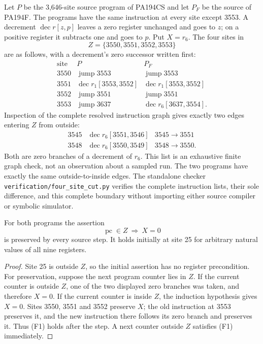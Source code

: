 Let $P$ be the 3,646-site source program of PA194CS and let $P_F$ be the
source of PA194F. The programs have the same instruction at every site
except 3553. A decrement
$\operatorname{dec}r[z,p]$ leaves a zero register unchanged and goes to $z$;
on a positive register it subtracts one and goes to $p$. Put $X=r_6$.
The four sites in
\[
                         Z=\{3550,3551,3552,3553\}
\]
are as follows, with a decrement's zero successor written first:
\[
\begin{array}{r|l|l}
\text{site}&P&P_F\\\hline
3550&\operatorname{jump}3553&\operatorname{jump}3553\\
3551&\operatorname{dec}r_1[3553,3552]
    &\operatorname{dec}r_1[3553,3552]\\
3552&\operatorname{jump}3551&\operatorname{jump}3551\\
3553&\operatorname{jump}3637&\operatorname{dec}r_6[3637,3554].
\end{array}
\]
Inspection of the complete resolved instruction graph gives exactly two
edges entering $Z$ from outside:
\[
\begin{array}{r|l|c}
3545&\operatorname{dec}r_6[3551,3546]&3545\longrightarrow3551\\
3548&\operatorname{dec}r_6[3550,3549]&3548\longrightarrow3550.
\end{array}
\]
Both are zero branches of a decrement of $r_6$. This list is an exhaustive
finite graph check, not an observation about a sampled run. The two
programs have exactly the same outside-to-inside edges.
The standalone checker \texttt{verification/four\_site\_cut.py} verifies
the complete instruction lists, their sole difference, and this complete
boundary without importing either source compiler or symbolic simulator.

\begin{lemma}
For both programs the assertion
\[
                   \operatorname{pc}\in Z\ \Longrightarrow\ X=0
                                                        \tag{F1}
\]
is preserved by every source step. It holds initially at site 25 for
arbitrary natural values of all nine registers.
\end{lemma}
\begin{proof}
Site 25 is outside $Z$, so the initial assertion has no register
precondition. For preservation, suppose the next program counter lies
in $Z$. If the current counter is outside $Z$, one of the two displayed
zero branches was taken, and therefore $X=0$. If the current counter is
inside $Z$, the induction hypothesis gives $X=0$. Sites 3550, 3551 and
3552 preserve $X$; the old instruction at 3553 preserves it, and the new
instruction there follows its zero branch and preserves it. Thus (F1)
holds after the step. A next counter outside $Z$ satisfies (F1)
immediately.
\end{proof}

